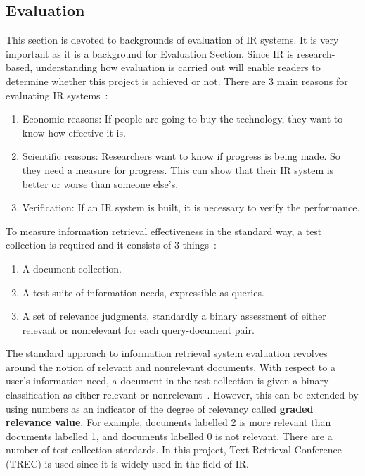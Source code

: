 \subsection{Evaluation}\label{sec:evaluation}
This section is devoted to backgrounds of evaluation of IR systems. It is very important as it is a background for Evaluation Section. 
Since IR is research-based, understanding how evaluation is carried out will enable readers to determine whether 
this project is achieved or not. There are 3 main reasons for evaluating IR systems~\cite[P. 3]{eval}: 
\begin{enumerate}
 \item Economic reasons: If people are going to buy the technology, they want to know how effective it is.
 \item Scientific reasons: Researchers want to know if progress is being made. So they need a measure for progress. 
	This can show that their IR system is better or worse than someone else's.
 \item Verification: If an IR system is built, it is necessary to verify the performance.
\end{enumerate}

To measure information retrieval effectiveness in the standard way, a test collection is required and it consists of 3 things~\cite{evalweb}:
\begin{enumerate}
 \item A document collection.
 \item A test suite of information needs, expressible as queries.
 \item A set of relevance judgments, standardly a binary assessment of either relevant or nonrelevant for each query-document pair.
\end{enumerate}

The standard approach to information retrieval system evaluation revolves around the notion of relevant and nonrelevant documents. With respect 
to a user's information need, a document in the test collection is given a binary classification as either relevant or nonrelevant~\cite{evalweb}. However,
this can be extended by using numbers as an indicator of the degree of relevancy called \textbf{graded relevance value}. For example, documents labelled 2 is more relevant than documents
labelled 1, and documents labelled 0 is not relevant. There are a number of test collection stardards. In this project, Text Retrieval Conference (TREC)
is used since it is widely used in the field of IR.

